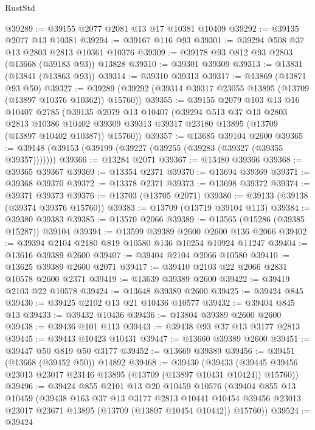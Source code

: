 \begin{lexlean}{RustStd}
\begin{coremodule}
@39289 := @39155 @2077 @2081 @13 @17 @10381 @10409
@39292 := @39135 @2077 @13 @10381
@39294 := @39167 @116 @93
@39301 := @39294 @508 @37 @13 @2803 @2813 @10361 @10376
@39309 := @39178 @93 @812 @93 @2803 (@13668 (@39183 @93)) @13828
@39310 := @39301 @39309
@39313 := @13831 (@13841 (@13863 @93))
@39314 := @39310 @39313
@39317 := @13869 (@13871 @93 @50)
@39327 := @39289 (@39292 (@39314 @39317 @23055 @13895 (@13709 (@13897 @10376 @10362)) @15760))
@39355 := @39155
    @2079
    @103
    @13
    @16
    @10407
    @2785
    (@39135
      @2079
      @13
      @10407
      (@39294
        @513
        @37
        @13
        @2803
        @2813
        @10386
        @10402
        @39309
        @39313
        @39317
        @23180
        @13895
        (@13709 (@13897 @10402 @10387))
        @15760))
@39357 := @13685 @39104 @2600
@39365 := @39148 (@39153 (@39199 (@39227 (@39255 (@39283 (@39327 (@39355 @39357)))))))
@39366 := @13284 @2071
@39367 := @13480 @39366
@39368 := @39365 @39367
@39369 := @13354 @2371
@39370 := @13694 @39369
@39371 := @39368 @39370
@39372 := @13378 @2371
@39373 := @13698 @39372
@39374 := @39371 @39373
@39376 := @13703 (@13705 @2071)
@39380 := @39133 (@39138 (@39374 @39376 @15760))
@39383 := @13709 (@13719 @39104 @113)
@39384 := @39380 @39383
@39385 := @13570 @2066
@39389 := @13565 (@15286 (@39385 @15287)) @39104
@39394 := @13599 @39389 @2600 @2600 @136 @2066
@39402 := @39394 @2104 @2180 @819 @10580 @136 @10254 @10924 @11247
@39404 := @13616 @39389 @2600
@39407 := @39404 @2104 @2066 @10580
@39410 := @13625 @39389 @2600 @2071
@39417 := @39410 @2103 @22 @2066 @2831 @10578 @2600 @2371
@39419 := @13639 @39389 @2600
@39422 := @39419 @2103 @22 @10578
@39424 := @13648 @39389 @2600
@39425 := @39424 @845
@39430 := @39425 @2102 @13 @21 @10436 @10577
@39432 := @39404 @845 @13
@39433 := @39432 @10436
@39436 := @13804 @39389 @2600 @2600
@39438 := @39436 @101 @113
@39443 := @39438 @93 @37 @13 @3177 @2813
@39445 := @39443 @10423 @10431
@39447 := @13660 @39389 @2600
@39451 := @39447 @50 @819 @50 @3177
@39452 := @13669 @39389
@39456 := @39451 (@13668 (@39452 @50)) @14892
@39468 := @39430
    (@39433 (@39445 @39456 @23013 @23017 @23146 @13895 (@13709 (@13897 @10431 @10424)) @15760))
@39496 := @39424
    @855
    @2101
    @13
    @20
    @10459
    @10576
    (@39404
      @855
      @13
      @10459
      (@39438
        @163
        @37
        @13
        @3177
        @2813
        @10441
        @10454
        @39456
        @23013
        @23017
        @23671
        @13895
        (@13709 (@13897 @10454 @10442))
        @15760))
@39524 := @39424

\end{coremodule}
\end{lexlean}
